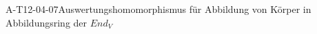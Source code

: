
\begin{EXA}{A-T12-04-07}{Auswertungshomomorphismus für Abbildung von Körper in Abbildungsring der $End_V$}
\end{EXA}
